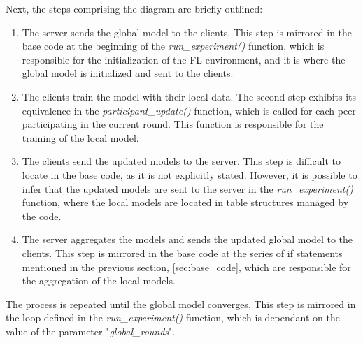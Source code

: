 Next, the steps comprising the diagram are briefly outlined:
\begin{enumerate}
        \item The server sends the global model to the clients. This step is mirrored in the base code at the beginning of the \textit{run\_experiment()} function, which is responsible for the initialization of the FL environment, and it is where the global model is initialized and sent to the clients.
        \item The clients train the model with their local data. The second step exhibits its equivalence in the \textit{participant\_update()} function, which is called for each peer participating in the current round. This function is responsible for the training of the local model.
        \item The clients send the updated models to the server. This step is difficult to locate in the base code, as it is not explicitly stated. However, it is possible to infer that the updated models are sent to the server in the \textit{run\_experiment()} function, where the local models are located in table structures managed by the code.
        \item The server aggregates the models and sends the updated global model to the clients. This step is mirrored in the base code at the series of if statements mentioned in the previous section, \ref{sec:base_code}, which are responsible for the aggregation of the local models.
\end{enumerate}
The process is repeated until the global model converges. This step is mirrored in the loop defined in the \textit{run\_experiment()} function, which is dependant on the value of the parameter "\textit{global\_rounds}".


\pagebreak